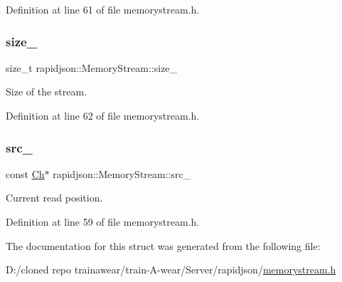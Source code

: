 Definition at line 61 of file memorystream.\+h.

\mbox{\label{structrapidjson_1_1_memory_stream_a8c8437d59c32168a74226312d9e96ace}} 
\subsubsection{\texorpdfstring{size\_}{size\_}}
{\footnotesize\ttfamily size\+\_\+t rapidjson\+::\+Memory\+Stream\+::size\+\_\+}



Size of the stream. 



Definition at line 62 of file memorystream.\+h.

\mbox{\label{structrapidjson_1_1_memory_stream_ac0b4da6016e5ba6241604fd4258fb722}} 
\subsubsection{\texorpdfstring{src\_}{src\_}}
{\footnotesize\ttfamily const \mbox{\hyperlink{structrapidjson_1_1_memory_stream_abf9f7cf51a5830ae45e24f5d55fdceaf}{Ch}}$\ast$ rapidjson\+::\+Memory\+Stream\+::src\+\_\+}



Current read position. 



Definition at line 59 of file memorystream.\+h.



The documentation for this struct was generated from the following file\+:\begin{DoxyCompactItemize}
\item 
D\+:/cloned repo trainawear/train-\/\+A-\/wear/\+Server/rapidjson/\mbox{\hyperlink{memorystream_8h}{memorystream.\+h}}\end{DoxyCompactItemize}
